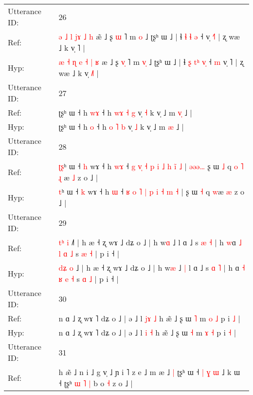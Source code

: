 \documentclass[10pt]{article}
\DeclareRobustCommand{\hl}[1]{{\textcolor{red}{#1}}}
\begin{document}
\begin{longtable}{ll}
 \\
\midrule
Utterance ID: & 26 \\
Ref: & \hl{ə} \hl{˩} \hl{l} \hl{}\hl{j}\hl{ɤ} \hl{˩} \hl{h} æ\hl{̃} ˩ ʂ \hl{}\hl{ɯ} ˥ m \hl{}\hl{o} ˩ ʈʂʰ ɯ ˩ | ɬ \hl{ɬ} \hl{}\hl{ɬ} \hl{}\hl{ə} ˧\hl{}\hl{} v̩ \hl{˧}˥ | ʐ wæ ˩ k v̩ \hl{}˥ |
 \\
Hyp: & \hl{æ} \hl{˧} \hl{ɳ} \hl{e}\hl{ }\hl{˧} \hl{|} \hl{ʁ} æ\hl{} ˩ ʂ \hl{v}\hl{̩} ˥ m \hl{v}\hl{̩} ˩ ʈʂʰ ɯ ˩ | ɬ \hl{ʂ} \hl{t}\hl{ʰ} \hl{v}\hl{̩} ˧\hl{ }\hl{m} v̩ \hl{}˥ | ʐ wæ ˩ k v̩ \hl{˩}˥ |
 \\
\midrule
Utterance ID: & 27 \\
Ref: & ʈʂʰ ɯ ˧ h \hl{w}\hl{ɤ} ˧ h \hl{w}\hl{ɤ} \hl{˧} \hl{g} v̩ \hl{˧} k v̩ ˩ m \hl{v}\hl{̩} ˩ |
 \\
Hyp: & ʈʂʰ ɯ ˧ h \hl{}\hl{o} ˧ h \hl{}\hl{o} \hl{˥} \hl{b} v̩ \hl{˩} k v̩ ˩ m \hl{}\hl{æ} ˩ |
 \\
\midrule
Utterance ID: & 28 \\
Ref: & \hl{ʈ}\hl{ʂ}ʰ ɯ ˧ \hl{h} wɤ ˧ h \hl{w}\hl{ɤ} ˧ \hl{g} \hl{v}\hl{̩} \hl{˧} \hl{p} \hl{i} \hl{˩} \hl{h} \hl{i}\hl{̃} \hl{˩} |\hl{ }\hl{ə}\hl{ə}\hl{ə}\hl{…} ʂ ɯ \hl{˩} q\hl{ }\hl{o}\hl{ }\hl{˥} \hl{ɻ}\hl{ }æ \hl{˩} z o ˩ |
 \\
Hyp: & \hl{}\hl{t}ʰ ɯ ˧ \hl{k} wɤ ˧ h \hl{}\hl{ɯ} ˧ \hl{ʁ} \hl{}\hl{o} \hl{˥} \hl{|} \hl{p} \hl{i} \hl{˧} \hl{}\hl{m} \hl{˧} |\hl{}\hl{}\hl{}\hl{}\hl{} ʂ ɯ \hl{˧} q\hl{}\hl{}\hl{}\hl{} \hl{}\hl{w}æ \hl{æ} z o ˩ |
 \\
\midrule
Utterance ID: & 29 \\
Ref: & \hl{t}\hl{ʰ} \hl{i} ˩\hl{˥} | h æ ˧ ʐ wɤ ˩ dʑ o ˩ | h w\hl{ɑ} ˩\hl{}\hl{} l ɑ ˩ s \hl{æ} \hl{˧} | h \hl{w}ɑ \hl{˩} \hl{l} \hl{ɑ} \hl{˩} s \hl{æ} \hl{˧} | p i ˧ |
 \\
Hyp: & \hl{d}\hl{ʑ} \hl{o} ˩\hl{} | h æ ˧ ʐ wɤ ˩ dʑ o ˩ | h w\hl{æ} ˩\hl{ }\hl{|} l ɑ ˩ s \hl{ɑ} \hl{˥} | h \hl{}ɑ \hl{˧} \hl{ʁ} \hl{e} \hl{˧} s \hl{ɑ} \hl{˩} | p i ˧ |
 \\
\midrule
Utterance ID: & 30 \\
Ref: & n ɑ ˩ ʐ wɤ ˥ dʑ o ˩ | ə ˩ l \hl{j}\hl{ɤ} \hl{˩} h æ̃ ˩ ʂ ɯ \hl{˥} m \hl{o} \hl{˩} p i \hl{˩} |
 \\
Hyp: & n ɑ ˩ ʐ wɤ ˥ dʑ o ˩ | ə ˩ l \hl{}\hl{i} \hl{˧} h æ̃ ˩ ʂ ɯ \hl{˧} m \hl{ɤ} \hl{˧} p i \hl{˧} |
 \\
\midrule
Utterance ID: & 31 \\
Ref: & h æ̃ ˩ n i ˩ g v̩ ˩ ɲ i ˥ z e ˩ m æ ˩\hl{ }\hl{|} ʈʂʰ ɯ ˧ \hl{|} \hl{ɣ}\hl{ }\hl{ɯ} ˩ k ɯ ˧ ʈʂʰ\hl{ }\hl{ɯ} \hl{˥} \hl{|} b o \hl{˧} z o ˩ |

\end{longtable}
\end{document}

